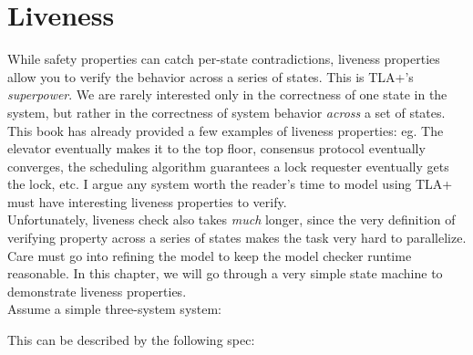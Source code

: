 % 

\chapter{Liveness}
\label{chap:liveness}

While safety properties can catch per-state contradictions, liveness properties
allow you to verify the behavior across a series of states. This is TLA+'s
\textit{superpower}. We are rarely interested only in the correctness of one
state in the system, but rather in the correctness of system behavior \textit{across} a set of states.\\

This book has already provided a few examples of liveness properties: eg.
The elevator eventually makes it to the top floor, consensus protocol eventually
converges, the scheduling algorithm guarantees a lock requester eventually gets the
lock, etc. I argue any system worth the reader's time to model using TLA+ must 
have interesting liveness properties to verify.\\

Unfortunately, liveness check also takes \textit{much} longer, since the very
definition of verifying property across a series of states makes the task very
hard to parallelize. Care must go into refining the model to keep the model
checker runtime reasonable. In this chapter, we will go through a very simple
state machine to demonstrate liveness properties. \\

Assume a simple three-system system:\\

\begin{center}
\end{center}

This can be described by the following spec:\newline

